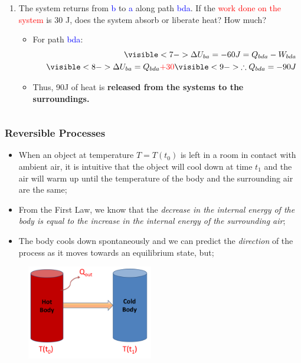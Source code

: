 \documentclass[10pt,compress]{beamer}
\newcommand{\red}{\textcolor{red}}
\begin{document}
\begin{frame}
\begin{columns}
\begin{column}[r]{0.5\linewidth}
\begin{enumerate}
    \item<5-> The system returns from \textcolor{blue}{b} to \textcolor{blue}{a} along path \textcolor{blue}{bda}. If the \red{work done on the system} is 30 J, does the system absorb or liberate heat? How much? 
       \begin{itemize}\scriptsize
         \item<6-> For path \textcolor{blue}{bda}:
           \begin{eqnarray}
            &&\visible<7->{\Delta U_{ba} = -60 J = Q_{bda}-W_{bda}} \nonumber \\
            &&\visible<8->{\Delta U_{ba} = Q_{bda} \red{+ 30}} \visible<9->{\therefore Q_{bda} = -90 J} \nonumber
           \end{eqnarray}
         \item<10-> Thus, 90J of heat is \bf{released from the systems to the surroundings}.
       \end{itemize}
   \end{enumerate}
  \end{column}
 \end{columns}
\normalsize
\end{frame}


\begin{frame}
 \frametitle{Reversible Processes}
   \begin{itemize}
    \item When an object at temperature $T=T\left(t_{0}\right)$ is left in a room in contact with ambient air, it is intuitive that the object will cool down at time $t_{1}$ and the air will warm up until the temperature of the body and the surrounding air are the same;
    \item From the First Law, we know that the {\it decrease in the internal energy of the body is equal to the increase in the internal energy of the surrounding air};
    \item The body cools down spontaneously and we can predict the {\it direction} of the process as it moves towards an equilibrium state, but; 
   \end{itemize}
    \begin{figure}%
     \begin{center}
      \includegraphics[width=5.5cm,clip]{./../Pics/HotColdCoffee}
     \end{center}
    \end{figure}
 \normalsize
\end{frame}
\end{document}
